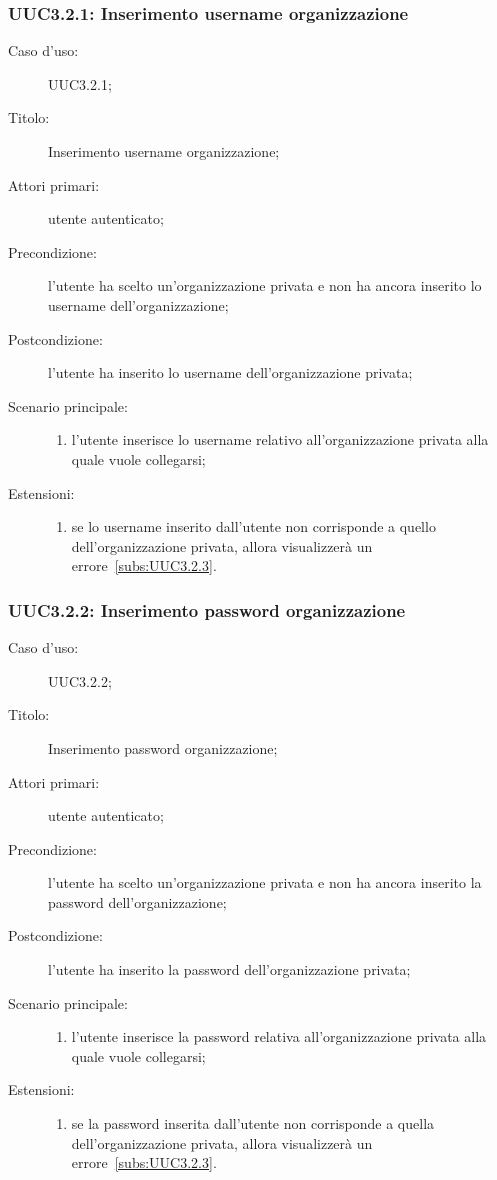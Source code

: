 \documentclass[../../../analisi-dei-requisiti.tex]{subfiles}
\begin{document}
\subsubsection{UUC3.2.1: Inserimento username organizzazione}%
\label{subs:UUC3.2.1}
\begin{description}
  \item[Caso d’uso:] UUC3.2.1;
  \item[Titolo:] Inserimento username organizzazione;
  \item[Attori primari:] utente autenticato;
  \item[Precondizione:] l'utente ha scelto un'organizzazione privata e non ha ancora inserito lo username dell'organizzazione;
  \item[Postcondizione:] l'utente ha inserito lo username dell'organizzazione privata;
  \item[Scenario principale:]
        \begin{enumerate}
          \item l'utente inserisce lo username relativo all'organizzazione privata alla quale vuole collegarsi;
        \end{enumerate}
  \item[Estensioni:]
        \begin{enumerate}
          \item se lo username inserito dall'utente non corrisponde a quello dell'organizzazione privata, allora visualizzerà un errore~\ref{subs:UUC3.2.3}.
        \end{enumerate}
\end{description}

\subsubsection{UUC3.2.2: Inserimento password organizzazione}%
\label{subs:UUC3.2.2}
\begin{description}
  \item[Caso d’uso:] UUC3.2.2;
  \item[Titolo:] Inserimento password organizzazione;
  \item[Attori primari:] utente autenticato;
  \item[Precondizione:] l'utente ha scelto un'organizzazione privata e non ha ancora inserito la password dell'organizzazione;
  \item[Postcondizione:] l'utente ha inserito la password dell'organizzazione privata;
  \item[Scenario principale:]
        \begin{enumerate}
          \item l'utente inserisce la password relativa all'organizzazione privata alla quale vuole collegarsi;
        \end{enumerate}
  \item[Estensioni:]
        \begin{enumerate}
          \item se la password inserita dall'utente non corrisponde a quella dell'organizzazione privata, allora visualizzerà un errore~\ref{subs:UUC3.2.3}.
        \end{enumerate}
\end{description}
\end{document}
